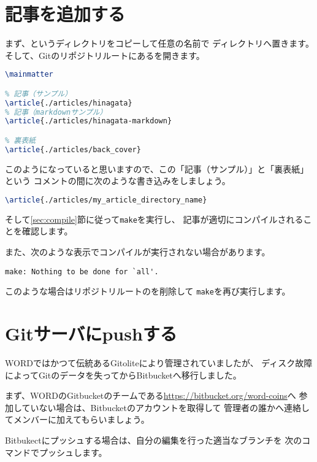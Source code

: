 \documentclass[../../main]{subfiles}
\begin{document}
\section{記事を追加する}

まず、というディレクトリをコピーして任意の名前で
ディレクトリへ置きます。
そして、Gitのリポジトリルートにあるを開きます。

\begin{lstlisting}[language=TeX]
\mainmatter

% 記事（サンプル）
\article{./articles/hinagata}
% 記事（markdownサンプル）
\article{./articles/hinagata-markdown}

% 裏表紙
\article{./articles/back_cover}
\end{lstlisting}

このようになっていると思いますので、この「記事（サンプル）」と「裏表紙」という
コメントの間に次のような書き込みをしましょう。

\begin{lstlisting}[language=TeX]
\article{./articles/my_article_directory_name}
\end{lstlisting}

そして\ref{sec:compile}節に従って\lstinline|make|を実行し、
記事が適切にコンパイルされることを確認します。

また、次のような表示でコンパイルが実行されない場合があります。

\begin{lstlisting}
make: Nothing to be done for `all'.
\end{lstlisting}

このような場合はリポジトリルートのを削除して
\lstinline|make|を再び実行します。

\section{Gitサーバにpushする}

WORDではかつて伝統あるGitoliteにより管理されていましたが、
ディスク故障によってGitのデータを失ってからBitbucketへ移行しました。

まず、WORDのGitbucketのチームである\url{https://bitbucket.org/word-coins}へ
参加していない場合は、Bitbucketのアカウントを取得して
管理者の誰かへ連絡してメンバーに加えてもらいましょう。

Bitbukectにプッシュする場合は、自分の編集を行った適当なブランチを
次のコマンドでプッシュします。
\end{document}

